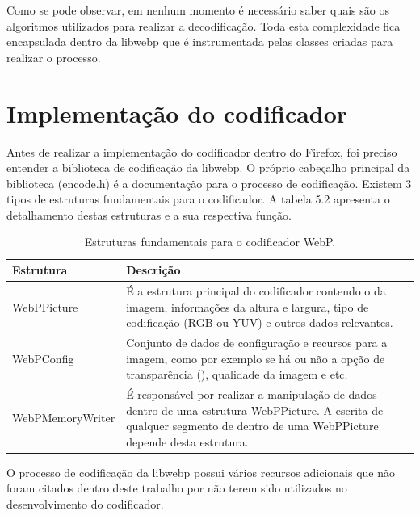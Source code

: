 \documentclass[espaco=simples,appendix=Name]{abnt}
\begin{document}
Como se pode observar, em nenhum momento é necessário saber quais são os algoritmos utilizados para realizar a decodificação. Toda esta complexidade fica encapsulada dentro da libwebp que é instrumentada pelas classes criadas para realizar o processo.

\section{Implementação do codificador}

Antes de realizar a implementação do codificador dentro do Firefox, foi preciso entender a biblioteca de codificação da libwebp. O próprio cabeçalho principal da biblioteca (encode.h) é a documentação para o processo de codificação. Existem 3 tipos de estruturas fundamentais para o codificador. A tabela 5.2 apresenta o detalhamento destas estruturas e a sua respectiva função.

\begin{table}[ht]
        \centering
        \caption{Estruturas fundamentais para o codificador WebP.
        \label{tbl:padc}}{
                \vspace{0.3cm}
                \begin{tabular}{|l|p{10cm}|}
                \hline
                        \textbf{Estrutura} & \textbf{Descrição} \\
                        \hline
                        WebPPicture		& É a estrutura principal do codificador contendo o \ingles{buffer} da imagem, informações da altura e largura, tipo de codificação (RGB ou YUV) e outros dados relevantes. \\
                        \hline
                        WebPConfig		& Conjunto de dados de configuração e recursos para a imagem, como por exemplo se há ou não a opção de transparência (\ingles{alpha}), qualidade da imagem e etc.  \\
                        \hline
                        WebPMemoryWriter	& É responsável por realizar a manipulação de dados dentro de uma estrutura WebPPicture. A escrita de qualquer segmento de \ingles{buffer} dentro de uma WebPPicture depende desta estrutura. \\
                        \hline
                \end{tabular}
                }
\end{table}

O processo de codificação da libwebp possui vários recursos adicionais que não foram citados dentro deste trabalho por não terem sido utilizados no desenvolvimento do codificador.
\end{document}
